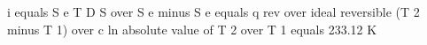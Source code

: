 i equals S e T D S over S e minus S e equals q rev over ideal reversible (T 2 minus T 1) over c ln absolute value of T 2 over T 1 equals 233.12 K